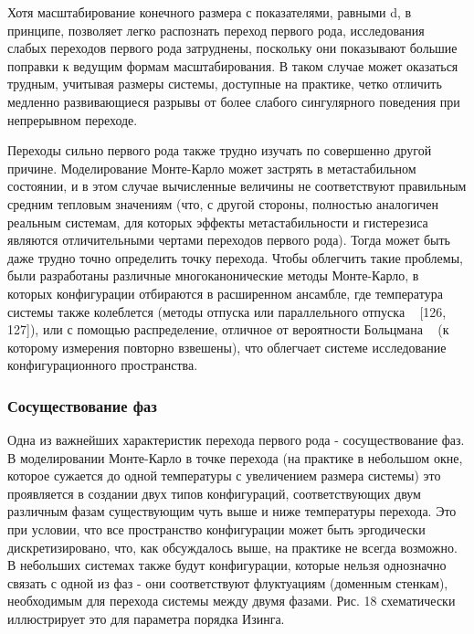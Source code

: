 \documentclass[11pt]{article}
\begin{document}
Хотя масштабирование конечного размера с показателями, равными d, в принципе, позволяет легко распознать переход первого рода, исследования слабых переходов первого рода затруднены, поскольку они показывают большие поправки к ведущим формам масштабирования. В таком случае может оказаться трудным, учитывая размеры системы, доступные на практике, четко отличить медленно развивающиеся разрывы от более слабого сингулярного поведения при непрерывном переходе.

Переходы сильно первого рода также трудно изучать по совершенно другой причине. Моделирование Монте-Карло может застрять в метастабильном состоянии, и в этом случае вычисленные величины не соответствуют правильным средним тепловым значениям (что, с другой стороны, полностью аналогичен реальным системам, для которых эффекты метастабильности и гистерезиса являются отличительными чертами переходов первого рода). Тогда может быть даже трудно точно определить точку перехода. Чтобы облегчить такие проблемы, были разработаны различные многоканонические методы Монте-Карло, в которых конфигурации отбираются в расширенном ансамбле, где температура системы также колеблется (методы отпуска или параллельного отпуска ~\cite{Marinari, psj_65_1604} [126, 127]), или с помощью распределение, отличное от вероятности Больцмана ~\cite{prl_68_9, pre_86_2050, pre_64_056101, pre_70_046701} (к которому измерения повторно взвешены), что облегчает системе исследование конфигурационного пространства.

\subsubsection{Сосуществование фаз}
Одна из важнейших характеристик перехода первого рода - сосуществование фаз. В моделировании Монте-Карло в точке перехода (на практике в небольшом окне, которое сужается до одной температуры с увеличением размера системы) это проявляется в создании двух типов конфигураций, соответствующих двум различным фазам существующим чуть выше и ниже температуры перехода. Это при условии, что все пространство конфигурации может быть эргодически дискретизировано, что, как обсуждалось выше, на практике не всегда возможно. В небольших системах также будут конфигурации, которые нельзя однозначно связать с одной из фаз - они соответствуют флуктуациям (доменным стенкам), необходимым для перехода системы между двумя фазами. Рис. 18 схематически иллюстрирует это для параметра порядка Изинга. 
\end{document}
